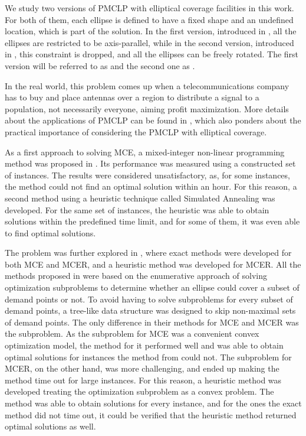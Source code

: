 We study two versions of PMCLP with elliptical coverage facilities in this work. For both of them, each ellipse is defined to have a fixed shape and an undefined location, which is part of the solution.
In the first version, introduced in \cite{canbolat}, all the ellipses are restricted to be axis-parallel, while in the second version, introduced in \cite{andreta}, this constraint is dropped, and all the ellipses can be freely rotated.
The first version will be referred to as  and the second one as  .

{\color{Green}
	In the real world, this problem comes up when a telecommunications company has to buy and place antennas over a region to distribute a signal to a population, not necessarily everyone, aiming profit maximization. 
	More details about the applications of PMCLP can be found in \cite{canbolat}, which also ponders about the practical importance of considering the PMCLP with elliptical coverage.
	
	As a first approach to solving MCE, a mixed-integer non-linear programming method was proposed in \cite{canbolat}. 
	Its performance was measured using a constructed set of instances. The results were considered unsatisfactory, as, for some instances, the method could not find an optimal solution within an hour. 
	For this reason, a second method using a heuristic technique called Simulated Annealing was developed. For the same set of instances, the heuristic was able to obtain solutions within the predefined time limit, and for some of them, it was even able to find optimal solutions.
}

The problem was further explored in , where exact methods were developed for both MCE and MCER, and a heuristic method was developed for MCER.
All the methods proposed in \cite{andreta} were based on the enumerative approach of solving optimization subproblems to determine whether an ellipse could cover a subset of demand points or not. To avoid having to solve subproblems for every subset of demand points, a tree-like data structure was designed to skip non-maximal sets of demand points.
The only difference in their methods for MCE and MCER was the subproblem.
As the subproblem for MCE was a convenient convex optimization model, the method for it performed well and  was able to obtain optimal solutions for instances the method from \cite{canbolat} could not.
The subproblem for MCER, on the other hand, was more challenging, and ended up making the method time out for large instances. For this reason, a heuristic method was developed treating the optimization subproblem as a convex problem. The method was able to obtain solutions for every instance, and for the ones the exact method did not time out, it could be verified that the heuristic method returned optimal {\color{blue}solutions} as well.

